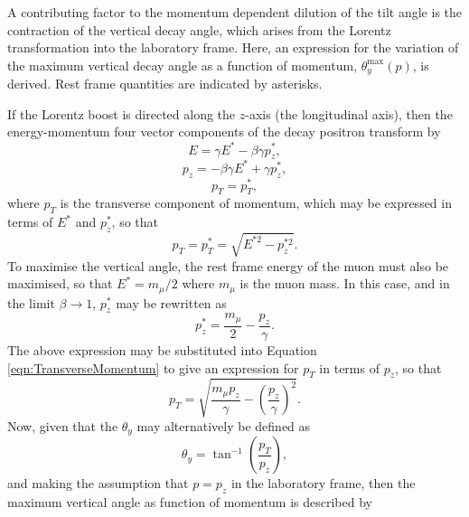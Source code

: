 \begin{appendices}
A contributing factor to the momentum dependent dilution of the tilt angle is the contraction of the vertical decay angle, which arises from the Lorentz transformation into the laboratory frame. Here, an expression for the variation of the maximum vertical decay angle as a function of momentum, $\theta_{y}^{\text{max}}(p)$, is derived. Rest frame quantities are indicated by asterisks. 

If the Lorentz boost is directed along the $z$-axis (the longitudinal axis), then the energy-momentum four vector components of the decay positron transform by
\begin{equation}
  E = \gamma E^{*} - \beta \gamma p_{z}^{*},
\end{equation}
%
\begin{equation}
  p_{z} = -\beta \gamma E^{*} + \gamma p_{z}^{*},
\end{equation}
%
\begin{equation}
  p_{T} = p_{T}^{*},
\end{equation}
%
where $p_{T}$ is the transverse component of momentum, which may be expressed in terms of $E^{*}$ and $p_{z}^{*}$, so that
%
\begin{equation}
  p_{T} = p_{T}^{*} = \sqrt{E^{*2} - p_{z}^{*2}}.
  \label{eqn:TransverseMomentum}
\end{equation}
%
To maximise the vertical angle, the rest frame energy of the muon must also be maximised, so that $E^{*}=m_{\mu}/2$ where $m_{\mu}$ is the muon mass. In this case, and in the limit $\beta\rightarrow1$, $p_{z}^{*}$ may be rewritten as 
%
\begin{equation}
  p_{z}^{*} = \frac{m_{\mu}}{2}-\frac{p_{z}}{\gamma}.
  \label{eqn:VerticalMomentumForMaxAngle}
\end{equation} 
%
The above expression may be substituted into Equation \ref{eqn:TransverseMomentum} to give an expression for $p_{T}$ in terms of $p_{z}$, so that
%
\begin{equation}
  p_{T} = \sqrt{\frac{ m_{\mu}p_{z}}{\gamma} - \left(\frac{p_{z}} {\gamma}\right)^{2} }.
  \label{eqn:MaxTransverseMomentum}
\end{equation} 
%
Now, given that the $\theta_{y}$ may alternatively be defined as 
%
\begin{equation}
  \theta_{y} = \tan^{-1}{\left(\frac{p_{T}}{p_{z}}\right)}, 
  \label{eqn:theta_y_alt}
\end{equation}
%
and making the assumption that $p=p_{z}$ in the laboratory frame, then the maximum vertical angle as function of momentum is described by

\end{appendices}
